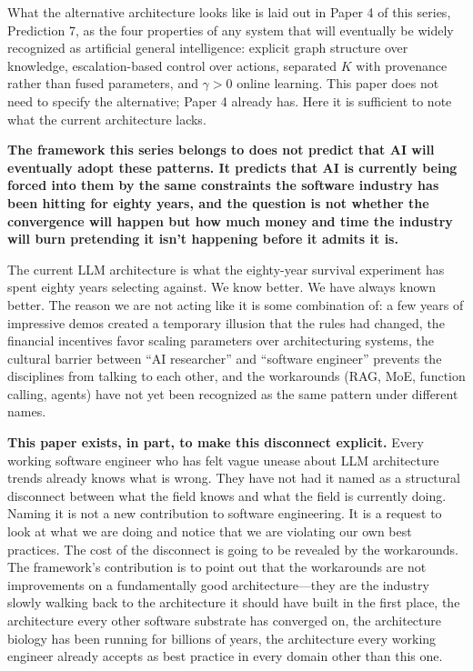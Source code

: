 \documentclass[11pt]{article}
\begin{document}
What the alternative architecture looks like is laid out in Paper 4 of this series, Prediction 7, as the four properties of any system that will eventually be widely recognized as artificial general intelligence: explicit graph structure over knowledge, escalation-based control over actions, separated $K$ with provenance rather than fused parameters, and $\gamma > 0$ online learning. This paper does not need to specify the alternative; Paper 4 already has. Here it is sufficient to note what the current architecture lacks.

\textbf{The framework this series belongs to does not predict that AI will eventually adopt these patterns. It predicts that AI is currently being forced into them by the same constraints the software industry has been hitting for eighty years, and the question is not whether the convergence will happen but how much money and time the industry will burn pretending it isn't happening before it admits it is.}

The current LLM architecture is what the eighty-year survival experiment has spent eighty years selecting against. We know better. We have always known better. The reason we are not acting like it is some combination of: a few years of impressive demos created a temporary illusion that the rules had changed, the financial incentives favor scaling parameters over architecturing systems, the cultural barrier between ``AI researcher'' and ``software engineer'' prevents the disciplines from talking to each other, and the workarounds (RAG, MoE, function calling, agents) have not yet been recognized as the same pattern under different names.

\textbf{This paper exists, in part, to make this disconnect explicit.} Every working software engineer who has felt vague unease about LLM architecture trends already knows what is wrong. They have not had it named as a structural disconnect between what the field knows and what the field is currently doing. Naming it is not a new contribution to software engineering. It is a request to look at what we are doing and notice that we are violating our own best practices. The cost of the disconnect is going to be revealed by the workarounds. The framework's contribution is to point out that the workarounds are not improvements on a fundamentally good architecture---they are the industry slowly walking back to the architecture it should have built in the first place, the architecture every other software substrate has converged on, the architecture biology has been running for billions of years, the architecture every working engineer already accepts as best practice in every domain other than this one.
\end{document}
